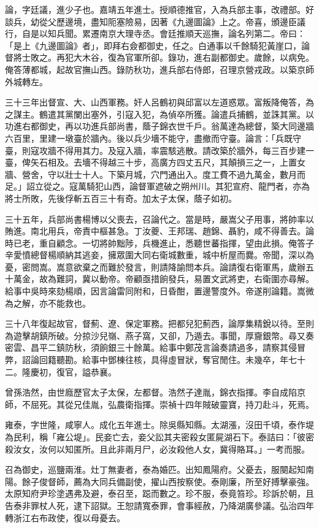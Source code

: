 \begin{pinyinscope}
論，字廷議，進少子也。嘉靖五年進士。授順德推官，入為兵部主事，改禮部。好談兵，幼從父歷邊境，盡知阨塞險易，因著《九邊圖論》上之。帝喜，頒邊臣議行，自是以知兵聞。累遷南京大理寺丞。會廷推順天巡撫，論名列第二。帝曰：「是上《九邊圖論》者」，即拜右僉都御史，任之。白通事以千餘騎犯黃崖口，論督將士敗之。再犯大木谷，復為官軍所卻。錄功，進右副都御史。歲餘，以病免。俺答薄都城，起故官撫山西。錄防秋功，進兵部右侍郎，召理京營戎政。以築京師外城轉左。

三十三年出督宣、大、山西軍務。奸人呂鶴初與邱富以左道惑眾。富叛降俺答，為之謀主。鶴遣其黨闌出塞外，引寇入犯，為偵卒所獲。論遣兵捕鶴，並誅其黨。以功進右都御史，再以功進兵部尚書，蔭子錦衣世千戶。翁萬達為總督，築大同邊牆六百里，里建一墩臺於牆內。後以兵少墻不能守，盡撤而守臺。論言：「兵既守臺，則寇攻牆不得用其力。及寇入牆，率震駭逃散。請改築於牆外，每三百步建一臺，俾矢石相及。去墻不得越三十步，高廣方四丈五尺，其顛損三之一，上置女牆、營舍，守以壯士十人。下築月城，穴門通出入。度工費不過九萬金，數月而足。」詔立從之。寇萬騎犯山西，論督軍遮破之朔州川。其犯宣府、龍門者，亦為將士所敗，先後俘斬五百三十有奇。加太子太保，蔭子如初。

三十五年，兵部尚書楊博以父喪去，召論代之。當是時，嚴嵩父子用事，將帥率以賄進。南北用兵，帝責中樞甚急。丁汝夔、王邦瑞、趙錦、聶豹，咸不得善去。論時已老，重自顧念。一切將帥黜陟，兵機進止，悉聽世蕃指揮，望由此損。俺答子辛愛憤總督楊順納其逃妾，擁眾圍大同右衛城數重，城中析屋而爨。帝聞，深以為憂，密問嵩。嵩意欲棄之而難於發言，則請降諭問本兵。論請復右衛軍馬，歲辦五十萬金，故為難詞，冀以動帝。帝顧亟措餉發兵，易置文武將吏，右衛圍亦尋解。給事中吳時來劾楊順，因言論雷同附和，日昏酣，置邊警度外。帝遂削論籍。嵩微為之解，亦不能救也。

三十八年復起故官，督薊、遼、保定軍務。把都兒犯薊西，論厚集精銳以待。至則為遊擊胡鎮所破。分掠沙兒嶺、燕子窩，又卻，乃遁去。事聞，厚齎銀幣。尋又奏密雲、昌平二鎮防秋，須餉銀三十餘萬。給事中鄭茂言論奏請過多，請察其侵冒弊，詔論回籍聽勘。給事中鄧棟往核，具得虛冒狀，奪官閒住。未幾卒，年七十二。隆慶初，復官，謚恭襄。

曾孫浩然，由世廕歷官太子太保，左都督。浩然子達胤，錦衣指揮。李自成陷京師，不屈死。其從兄佳胤，弘農衛指揮。崇禎十四年賊破靈寶，持刀赴斗，死焉。

雍泰，字世隆，咸寧人。成化五年進士。除吳縣知縣。太湖漲，沒田千頃，泰作堤為民利，稱「雍公堤」。民妾亡去，妾父訟其夫密殺女匿屍湖石下。泰詰曰：「彼密殺汝女，汝何以知匿所。且此非兩月尸，必汝殺他人女，冀得賂耳。」一考而服。

召為御史，巡鹽兩淮。灶丁無妻者，泰為婚匹。出知鳳陽府。父憂去，服闋起知南陽。餘子俊督師，薦為大同兵備副使，擢山西按察使。泰剛廉，所至好搏擊豪強。太原知府尹珍塗遇弗及避，泰召至，跽而數之。珍不服，泰竟笞珍。珍訴於朝，且告泰非罪杖人死，逮下詔獄。王恕請寬泰罪，會事經赦，乃降湖廣參議。弘治四年轉浙江右布政使，復以母憂去。


\end{pinyinscope}
